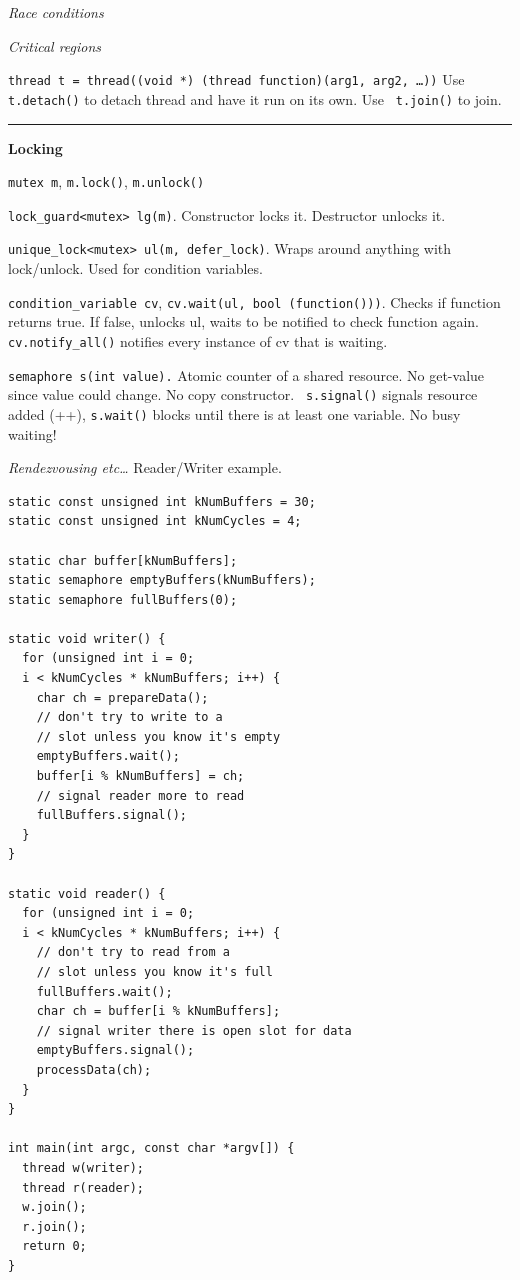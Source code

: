 \documentclass{article}
\begin{document}
\begin{multicols}{2}
  {\it Race conditions}

  {\it Critical regions}

  {\tt thread t = thread((void *) (thread function)(arg1, arg2, \ldots))} Use
  {\tt t.detach()} to detach thread and have it run on its own. Use {\tt
  t.join()} to join.

  \noindent\rule{4cm}{0.4pt}

  {\bf Locking}

  {\tt mutex m}, {\tt m.lock()}, {\tt m.unlock()}

  {\tt lock\_guard<mutex> lg(m)}. Constructor locks it. Destructor unlocks it.

  {\tt unique\_lock<mutex> ul(m, defer\_lock)}. Wraps around anything with
  lock/unlock. Used for condition variables.

  {\tt condition\_variable cv}, {\tt cv.wait(ul, bool (function()))}. Checks if
  function returns true. If false, unlocks ul, waits to be notified to check
  function again. {\tt cv.notify\_all()} notifies every instance of cv that is
  waiting.

  {\tt semaphore s(int value).} Atomic counter of a shared resource. No
  get-value since value could change. No copy constructor. {\tt
  s.signal()} signals resource added (++), {\tt s.wait()} blocks until there is
  at least one variable. No busy waiting!

  {\it Rendezvousing etc\ldots} Reader/Writer example.
  \begin{verbatim}
static const unsigned int kNumBuffers = 30;
static const unsigned int kNumCycles = 4;

static char buffer[kNumBuffers];
static semaphore emptyBuffers(kNumBuffers);
static semaphore fullBuffers(0);

static void writer() {
  for (unsigned int i = 0;
  i < kNumCycles * kNumBuffers; i++) {
    char ch = prepareData();
    // don't try to write to a
    // slot unless you know it's empty
    emptyBuffers.wait();
    buffer[i % kNumBuffers] = ch;
    // signal reader more to read
    fullBuffers.signal();
  }
}

static void reader() {
  for (unsigned int i = 0;
  i < kNumCycles * kNumBuffers; i++) {
    // don't try to read from a
    // slot unless you know it's full
    fullBuffers.wait();
    char ch = buffer[i % kNumBuffers];
    // signal writer there is open slot for data
    emptyBuffers.signal();
    processData(ch);
  }
}

int main(int argc, const char *argv[]) {
  thread w(writer);
  thread r(reader);
  w.join();
  r.join();
  return 0;
}
  \end{verbatim}


\end{multicols}
\end{document}
